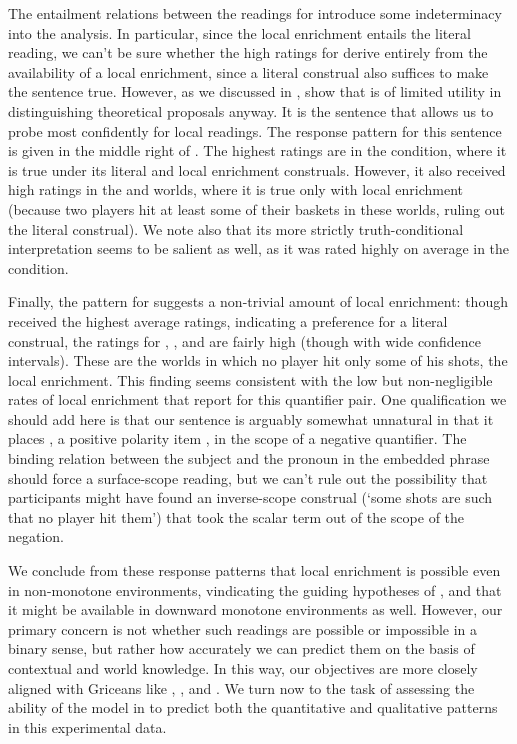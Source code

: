 \documentclass[leqno]{article}
\begin{document}
The entailment relations between the readings for 
introduce some indeterminacy into the analysis. In particular, since
the local enrichment entails the literal reading, we can't be sure
whether the high ratings for  derive entirely from the
availability of a local enrichment, since a literal construal also
suffices to make the sentence true. However, as we discussed in
, \citeauthor{Chemla:Spector:2011} show that
 is of limited utility in distinguishing
theoretical proposals anyway. It is the 
sentence that allows us to probe most confidently for local
readings. The response pattern for this sentence is given in the
middle right of . The highest ratings are in
the  condition, where it is true under its literal and
local enrichment construals. However, it also received high ratings in
the  and  worlds, where it is true only with
local enrichment (because two players hit at least some of their
baskets in these worlds, ruling out the literal construal).  We note
also that its more strictly truth-conditional interpretation seems to
be salient as well, as it was rated highly on average in the
 condition.

Finally, the pattern for  suggests a non-trivial
amount of local enrichment: though  received the highest
average ratings, indicating a preference for a literal construal, the
ratings for , , and  are fairly high
(though with wide confidence intervals). These are the worlds in which
no player hit only some of his shots, the local enrichment. This
finding seems consistent with the low but non-negligible rates of
local enrichment that  report for
this quantifier pair. One qualification we should add here is that our
sentence is arguably somewhat unnatural in that it places ,
a positive polarity item \citep{Baker70,Israel96}, in the scope of a
negative quantifier. The binding relation between the subject and the
pronoun  in the embedded phrase should force a surface-scope
reading, but we can't rule out the possibility that participants might
have found an inverse-scope construal (`some shots are such that no
player hit them') that took the scalar term out of the scope of the
negation.

We conclude from these response patterns that local enrichment is
possible even in non-monotone environments, vindicating the guiding
hypotheses of \citet{Chemla:Spector:2011}, and that it might be
available in downward monotone environments as well. However, our
primary concern is not whether such readings are possible or
impossible in a binary sense, but rather how accurately we can predict
them on the basis of contextual and world knowledge. In this way, our
objectives are more closely aligned with Griceans like
\citet{Geurts09}, \citet{Geurts:Pouscoulous:2009}, and
\citet{geurts-vantiel:2013:scalar}. We turn now to the task of
assessing the ability of the model in  to predict
both the quantitative and qualitative patterns in this experimental
data.
\end{document}
